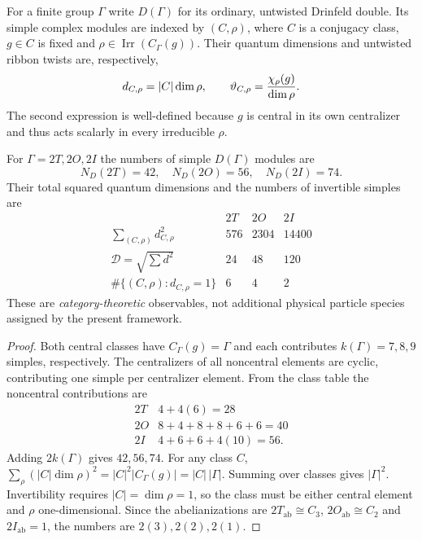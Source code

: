 \documentclass[11pt]{article}
\begin{document}
\begin{definition}
\label{p1b:def:v14-drinfeld-double}
For a finite group $\Gamma$ write $D(\Gamma)$ for its ordinary, untwisted
Drinfeld double. Its simple complex modules are indexed by $(C,\rho)$,
where $C$ is a conjugacy class, $g\in C$ is fixed and
$\rho\in\operatorname{Irr}(C_\Gamma(g))$.  Their quantum dimensions and
untwisted ribbon twists are, respectively,
\[
 d_{C,\rho}=|C|\dim\rho,\qquad
 \vartheta_{C,\rho}={\chi_\rho(g)\over\dim\rho}.
\]
The second expression is well-defined because $g$ is central in its own
centralizer and thus acts scalarly in every irreducible $\rho$.
\end{definition}

\begin{theorem}
\label{p1b:thm:v14-quantum-double-counts}
For $\Gamma=2T,2O,2I$ the numbers of simple $D(\Gamma)$ modules are
\[
 \boxed{N_D(2T)=42,\quad N_D(2O)=56,\quad N_D(2I)=74.}
\]
Their total squared quantum dimensions and the numbers of invertible
simples are
\[
\begin{array}{c|ccc}
 &2T&2O&2I\\\hline
 \sum_{(C,\rho)} d_{C,\rho}^2&576&2304&14400\\
 \mathcal D=\sqrt{\sum d^2}&24&48&120\\
 \#\{(C,\rho):d_{C,\rho}=1\}&6&4&2
\end{array}
\]
These are \emph{category-theoretic} observables, not additional physical
particle species assigned by the present framework.
\end{theorem}
\begin{proof}
Both central classes have $C_\Gamma(g)=\Gamma$ and each contributes
$k(\Gamma)=7,8,9$ simples, respectively.  The centralizers of all
noncentral elements are cyclic, contributing one simple per centralizer
element. From the class table the noncentral contributions are
\[
\begin{array}{c|c}
2T&4+4(6)=28\\
2O&8+4+8+8+6+6=40\\
2I&4+6+6+4(10)=56.
\end{array}
\]
Adding $2k(\Gamma)$ gives $42,56,74$.  For any class $C$,
$\sum_\rho (|C|\dim\rho)^2=|C|^2|C_\Gamma(g)|=|C|\,|\Gamma|$.
Summing over classes gives $|\Gamma|^2$. Invertibility requires
$|C|=\dim\rho=1$, so the class must be either central element and
$\rho$ one-dimensional. Since the abelianizations are
$2T_{\mathrm{ab}}\cong C_3$, $2O_{\mathrm{ab}}\cong C_2$ and
$2I_{\mathrm{ab}}=1$, the numbers are $2(3),2(2),2(1)$.
\end{proof}
\end{document}
